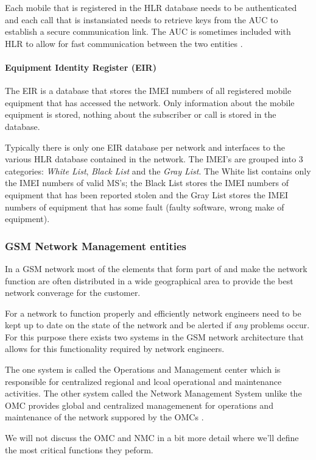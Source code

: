 Each mobile that is registered in the HLR database needs to be authenticated and each call that is instansiated needs to retrieve keys from the AUC to establish a secure communication link. The AUC is sometimes included with HLR to allow for fast communication between the two entities \cite{GSMSysEngin}.

\paragraph{Equipment Identity Register (EIR)}
The EIR is a database that stores the IMEI numbers of all registered mobile equipment that has accessed the network. Only information about the mobile equipment is stored, nothing about the subscriber or call is stored in the database.

Typically there is only one EIR database per network and interfaces to the various HLR database contained in the network. The IMEI's are grouped into 3 categories: \emph{White List}, \emph{Black List} and the \emph{Gray List}. The White list contains only the IMEI numbers of valid MS's; the Black List stores the IMEI numbers of equipment that has been reported stolen and the Gray List stores the IMEI numbers of equipment that has some fault (faulty software, wrong make of equipment).

\subsubsection{GSM Network Management entities}
In a GSM network most of the elements that form part of and make the network function are often distributed in a wide geographical area to provide the best network converage for the customer. 

For a network to function properly and efficiently network engineers need to be kept up to date on the state of the network and be alerted if \emph{any} problems occur. For this purpose there exists two systems in the GSM network architecture that allows for this functionality required by network engineers. 

The one system is called the Operations and Management center which is responsible for centralized regional and lcoal operational and maintenance activities. The other system called the Network Management System unlike the OMC provides global and centralized managemenent for operations and maintenance of the network suppored by the OMCs \cite{GSMSysEngin}.

We will not discuss the OMC and NMC in a bit more detail where we'll define the most critical functions they peform.

